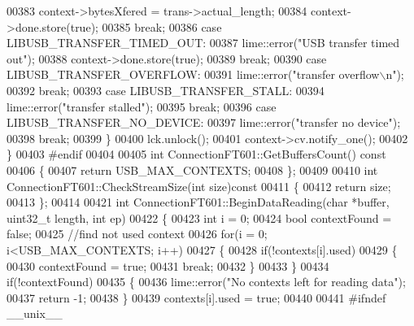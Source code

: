 \begin{DoxyCode}
{{{00383             context->bytesXfered = trans->actual\_length;
00384             context->done.store(\textcolor{keyword}{true});
00385             \textcolor{keywordflow}{break};
00386         \textcolor{keywordflow}{case} LIBUSB\_TRANSFER\_TIMED\_OUT:
00387             lime::error(\textcolor{stringliteral}{"USB transfer timed out"});
00388             context->done.store(\textcolor{keyword}{true});
00389             \textcolor{keywordflow}{break};
00390         \textcolor{keywordflow}{case} LIBUSB\_TRANSFER\_OVERFLOW:
00391             lime::error(\textcolor{stringliteral}{"transfer overflow\(\backslash\)n"});
00392             \textcolor{keywordflow}{break};
00393         \textcolor{keywordflow}{case} LIBUSB\_TRANSFER\_STALL:
00394             lime::error(\textcolor{stringliteral}{"transfer stalled"});
00395             \textcolor{keywordflow}{break};
00396         \textcolor{keywordflow}{case} LIBUSB\_TRANSFER\_NO\_DEVICE:
00397             lime::error(\textcolor{stringliteral}{"transfer no device"});
00398             \textcolor{keywordflow}{break};
00399     \}
00400     lck.unlock();
00401     context->cv.notify\_one();
00402 \}
00403 \textcolor{preprocessor}{#endif}
00404 
00405 \textcolor{keywordtype}{int} ConnectionFT601::GetBuffersCount()\textcolor{keyword}{ const}
00406 \textcolor{keyword}{}\{
00407     \textcolor{keywordflow}{return} USB\_MAX\_CONTEXTS;
00408 \};
00409 
00410 \textcolor{keywordtype}{int} ConnectionFT601::CheckStreamSize(\textcolor{keywordtype}{int} size)\textcolor{keyword}{const}
00411 \textcolor{keyword}{}\{
00412     \textcolor{keywordflow}{return} size;
00413 \};
00414 
00421 \textcolor{keywordtype}{int} ConnectionFT601::BeginDataReading(\textcolor{keywordtype}{char} *buffer, uint32\_t length, \textcolor{keywordtype}{int} ep)
00422 \{
00423     \textcolor{keywordtype}{int} i = 0;
00424     \textcolor{keywordtype}{bool} contextFound = \textcolor{keyword}{false};
00425     \textcolor{comment}{//find not used context}
00426     \textcolor{keywordflow}{for}(i = 0; i<USB\_MAX\_CONTEXTS; i++)
00427     \{
00428         \textcolor{keywordflow}{if}(!contexts[i].used)
00429         \{
00430             contextFound = \textcolor{keyword}{true};
00431             \textcolor{keywordflow}{break};
00432         \}
00433     \}
00434     \textcolor{keywordflow}{if}(!contextFound)
00435     \{
00436         lime::error(\textcolor{stringliteral}{"No contexts left for reading data"});
00437         \textcolor{keywordflow}{return} -1;
00438     \}
00439     contexts[i].used = \textcolor{keyword}{true};
00440 
00441 \textcolor{preprocessor}{#ifndef \_\_unix\_\_}
}}}
\end{DoxyCode}
